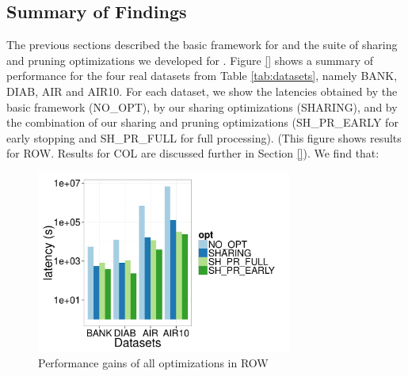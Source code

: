 \subsection{Summary of Findings}
\label{sec:expt_summary}

The previous sections described the basic framework for \SeeDB and the suite of sharing and pruning optimizations we developed for \SeeDB.
Figure \ref{} shows a summary of \SeeDB performance for the four real datasets from Table \ref{tab:datasets}, namely BANK, DIAB, AIR and AIR10. 
For each dataset, we show the latencies obtained by the basic \SeeDB framework (NO\_OPT), by our sharing optimizations (SHARING), and by the combination of our sharing and pruning optimizations (SH\_PR\_EARLY for early stopping and SH\_PR\_FULL for full processing).
(This figure shows results for ROW. Results for COL are discussed further in Section \ref{}).
We find that:

\begin{figure}[h]
	\centering
	\includegraphics[width=8.4cm] {Images/all_opt_real_data_row.pdf}
	\caption{Performance gains of all optimizations in ROW}
	\label{fig:share_prune_row}
	\vspace{-15pt}
\end{figure}


